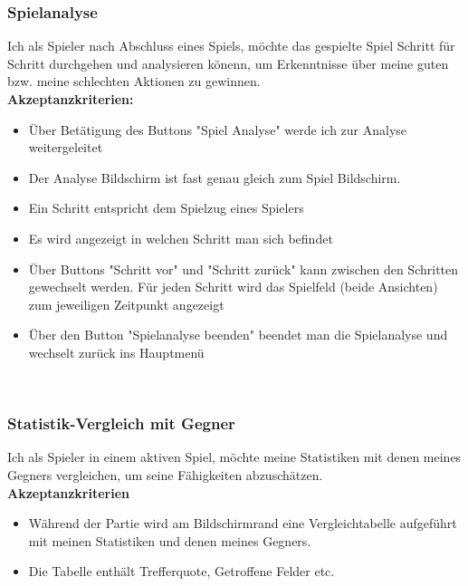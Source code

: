 \documentclass[conference]{IEEEtran}
\begin{document}
    \subsubsection{Spielanalyse}
    Ich als Spieler nach Abschluss eines Spiels, möchte das gespielte Spiel Schritt für Schritt durchgehen und analysieren könenn, um Erkenntnisse über meine guten bzw. meine schlechten Aktionen zu gewinnen. \\
     \textbf{Akzeptanzkriterien:}
    \begin{itemize}
        \item Über Betätigung des Buttons "Spiel Analyse" werde ich zur Analyse weitergeleitet
        \item Der Analyse Bildschirm ist fast genau gleich zum Spiel Bildschirm.
        \item Ein Schritt entspricht dem Spielzug eines Spielers
        \item Es wird angezeigt in welchen Schritt man sich befindet
        \item Über Buttons "Schritt vor" und "Schritt zurück" kann zwischen den Schritten gewechselt werden. Für jeden Schritt wird das Spielfeld (beide Ansichten) zum jeweiligen Zeitpunkt angezeigt
        \item Über den Button "Spielanalyse beenden" beendet man die Spielanalyse und wechselt zurück ins Hauptmenü
    \end{itemize}
    \ \\
    \subsubsection{Statistik-Vergleich mit Gegner}
    Ich als Spieler in einem aktiven Spiel, möchte meine Statistiken mit denen meines Gegners vergleichen, um seine Fähigkeiten abzuschätzen. \\
    \textbf{Akzeptanzkriterien}
    \begin{itemize}
        \item Während der Partie wird am Bildschirmrand eine Vergleichtabelle aufgeführt mit meinen Statistiken und denen meines Gegners.
        \item Die Tabelle enthält Trefferquote, Getroffene Felder etc.
    \end{itemize}
    \ \\
\end{document}
